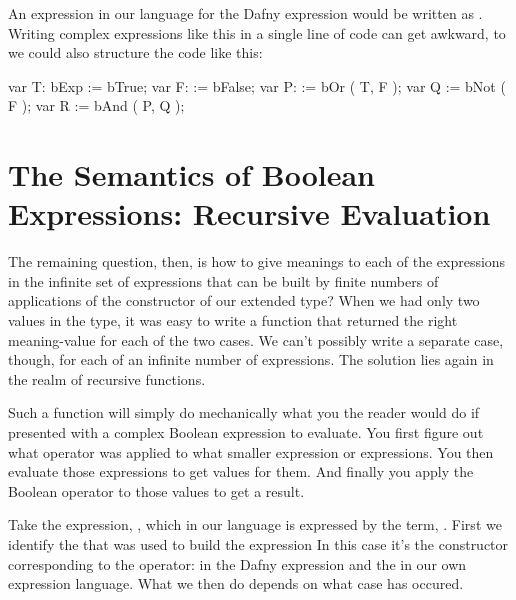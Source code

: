 \documentclass[letterpaper,10pt,english]{sphinxmanual}
\begin{document}
An expression in our  language for the Dafny expression  would be written as . Writing complex expressions like this in
a single line of code can get awkward, to we could also structure the
code like this:

\begin{sphinxVerbatim}[commandchars=\\\{\}]
var T: bExp := bTrue;
var F:      := bFalse;
var P:      := bOr ( T,  F );
var Q       := bNot ( F );
var R       := bAnd ( P, Q );
\end{sphinxVerbatim}


\section{The Semantics of Boolean Expressions: Recursive Evaluation}
\label{\detokenize{08-boolean-algebra:the-semantics-of-boolean-expressions-recursive-evaluation}}
The remaining question, then, is how to give meanings to each of the
expressions in the infinite set of expressions that can be built by
finite numbers of applications of the constructor of our extended
 type? When we had only two values in the type, it was easy to
write a function that returned the right meaning-value for each of the
two cases. We can’t possibly write a separate case, though, for each
of an infinite number of expressions. The solution lies again in the
realm of recursive functions.

Such a function will simply do mechanically what you the reader would
do if presented with a complex Boolean expression to evaluate.  You
first figure out what operator was applied to what smaller expression
or expressions. You then evaluate those expressions to get values for
them. And finally you apply the Boolean operator to those values to
get a result.

Take the expression, , which in our
language is expressed by the term, . First we identify the  that was used to build
the expression In this case it’s the constructor corresponding to the
 operator: \sphinxstyleemphasis{\&\&} in the Dafny expression and the  in our own
expression language. What we then do depends on what case has occured.
\end{document}
